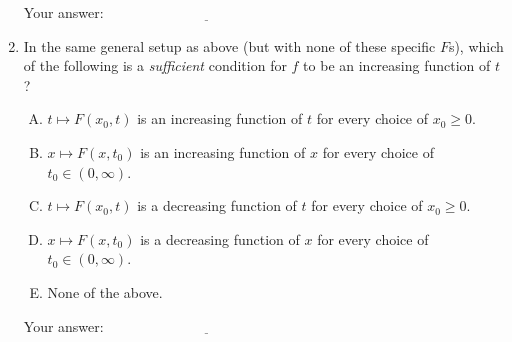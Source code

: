 \documentclass[10pt]{amsart}
\begin{document}
\begin{enumerate}
  \vspace{0.1in}
  Your answer: $\underline{\qquad\qquad\qquad\qquad\qquad\qquad\qquad}$
  \vspace{0.15in}

\item In the same general setup as above (but with none of these
  specific $F$s), which of the following is a {\em sufficient}
  condition for $f$ to be an increasing function of $t$?

  \begin{enumerate}[(A)]
  \item $t \mapsto F(x_0,t)$ is an increasing function of $t$ for
    every choice of $x_0 \ge 0$.
  \item $x \mapsto F(x,t_0)$ is an increasing function of $x$ for
    every choice of $t_0 \in (0,\infty)$.
  \item $t \mapsto F(x_0,t)$ is a decreasing function of $t$ for
    every choice of $x_0 \ge 0$.
  \item $x \mapsto F(x,t_0)$ is a decreasing function of $x$ for
  every choice of $t_0 \in (0,\infty)$.
  \item None of the above.
  \end{enumerate}

  \vspace{0.1in}
  Your answer: $\underline{\qquad\qquad\qquad\qquad\qquad\qquad\qquad}$
  \vspace{0.15in}

\end{enumerate}
\end{document}
